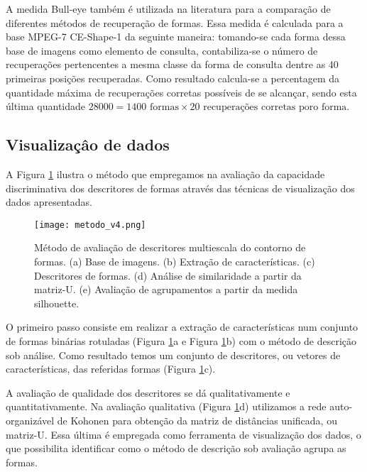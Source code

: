 A medida Bull-eye também é utilizada na literatura para a comparação de diferentes métodos de recuperação de formas. Essa medida é calculada para a base MPEG-7 CE-Shape-1 da seguinte maneira: tomando-se cada forma dessa base de imagens como elemento de consulta, contabiliza-se o número de recuperações pertencentes a mesma classe da forma de consulta dentre as 40 primeiras posições recuperadas. Como resultado calcula-se a percentagem da quantidade máxima de recuperações corretas possíveis de se alcançar, sendo esta última quantidade $28000 = 1400\text{ formas} \times 20\text{ recuperações corretas poro forma}$. 

\subsection{Visualizaçâo de dados}

A Figura \ref{fig:metodo_4} ilustra o método que empregamos na avaliação da capacidade discriminativa dos descritores de formas através das técnicas de visualização dos dados apresentadas.

\begin{figure}[h!]
  \caption{\label{fig:metodo_4} Método de avaliação de descritores multiescala do contorno de formas. (a) Base de imagens. (b) Extração de características. (c) Descritores de formas. (d) Análise de similaridade a partir da matriz-U. (e) Avaliação de agrupamentos a partir da medida silhouette.}
  \centering
  \texttt{[image: metodo\_v4.png]}
\end{figure}

O primeiro passo consiste em realizar a extração de características num conjunto de formas binárias rotuladas (Figura \ref{fig:metodo_4}a e Figura \ref{fig:metodo_4}b) com o método de descrição sob análise. Como resultado temos um conjunto de descritores, ou vetores de características, das referidas formas (Figura \ref{fig:metodo_4}c). 

A avaliação de qualidade dos descritores se dá qualitativamente e quantitativamente. Na avaliação qualitativa (Figura \ref{fig:metodo_4}d) utilizamos a rede auto-organizável de Kohonen para obtenção da matriz de distâncias unificada, ou matriz-U. Essa última é empregada como ferramenta de visualização dos dados, o que possibilita identificar como o método de descrição sob avaliação agrupa as formas. 

